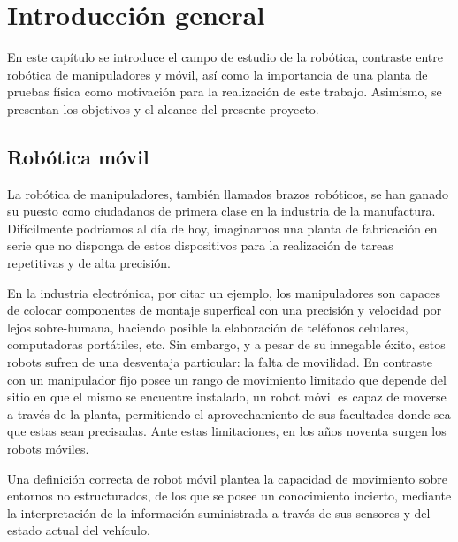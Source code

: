 
\chapter{Introducción general}

\label{Chapter1}

En este capítulo se introduce el campo de estudio de la robótica, contraste entre robótica de manipuladores y móvil, así como la importancia de una planta de pruebas física como motivación para la realización de este trabajo. Asimismo, se presentan los objetivos y el alcance del presente proyecto.


\section{Robótica móvil}

La robótica de manipuladores, también llamados brazos robóticos, se han ganado su puesto como ciudadanos de primera clase en la industria de la manufactura. Difícilmente podríamos al día de hoy, imaginarnos una planta de fabricación en serie que no disponga de estos dispositivos para la realización de tareas repetitivas y de alta precisión.

En la industria electrónica, por citar un ejemplo, los manipuladores son capaces de colocar componentes de montaje superfical con una precisión y velocidad por lejos sobre-humana, haciendo posible la elaboración de teléfonos celulares, computadoras portátiles, etc.
Sin embargo, y a pesar de su innegable éxito, estos robots sufren de una desventaja particular: la falta de movilidad. En contraste con un manipulador fijo posee un rango de movimiento limitado que depende del sitio en que el mismo se encuentre instalado, un robot móvil es capaz de moverse a través de la planta, permitiendo el aprovechamiento de sus facultades donde sea que estas sean precisadas. Ante estas limitaciones, en los años noventa surgen los robots móviles.

Una definición correcta de robot móvil plantea la capacidad de movimiento sobre entornos no estructurados, de los que se posee un conocimiento incierto, mediante la interpretación de la información suministrada a través de sus sensores y del estado actual del vehículo.

